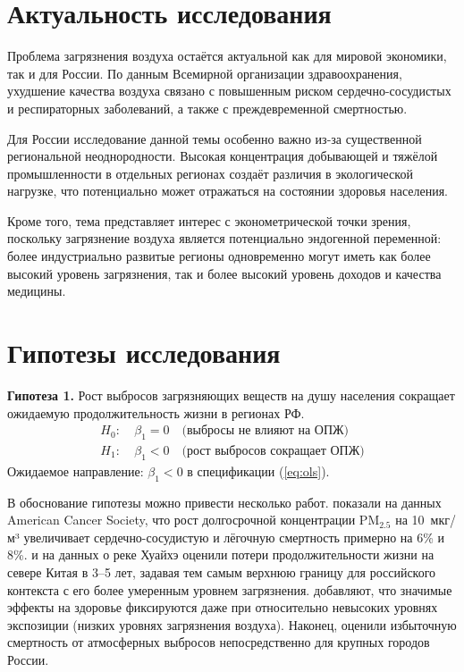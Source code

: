 \documentclass[11pt,a4paper]{article}
\begin{document}
\section*{Актуальность исследования}

Проблема загрязнения воздуха остаётся актуальной как для мировой экономики, так и для России. По данным Всемирной организации здравоохранения, ухудшение качества воздуха связано с повышенным риском сердечно-сосудистых и респираторных заболеваний, а также с преждевременной смертностью.

Для России исследование данной темы особенно важно из-за существенной региональной неоднородности. Высокая концентрация добывающей и тяжёлой промышленности в отдельных регионах создаёт различия в экологической нагрузке, что потенциально может отражаться на состоянии здоровья населения.

Кроме того, тема представляет интерес с эконометрической точки зрения, поскольку загрязнение воздуха является потенциально эндогенной переменной: более индустриально развитые регионы одновременно могут иметь как более высокий уровень загрязнения, так и более высокий уровень доходов и качества медицины.

\section*{Гипотезы исследования}

\textbf{Гипотеза 1.} Рост выбросов загрязняющих веществ на душу населения сокращает ожидаемую продолжительность жизни в регионах РФ.
\begin{align*}
H_0\colon\ & \beta_1 = 0 \quad \text{(выбросы не влияют на ОПЖ)}\\
H_1\colon\ & \beta_1 < 0 \quad \text{(рост выбросов сокращает ОПЖ)}
\end{align*}
Ожидаемое направление: $\beta_1 < 0$ в спецификации (\ref{eq:ols}).

В обоснование гипотезы можно привести несколько работ. \citet{pope2002} показали на данных American Cancer Society, что рост долгосрочной концентрации $\text{PM}_{2.5}$ на 10~мкг/м³ увеличивает сердечно-сосудистую и лёгочную смертность примерно на 6\% и 8\%. \citet{chen2013} и \citet{ebenstein2017} на данных о реке Хуайхэ оценили потери продолжительности жизни на севере Китая в 3--5 лет, задавая тем самым верхнюю границу для российского контекста с его более умеренным уровнем загрязнения. \citet{currie2005} добавляют, что значимые эффекты на здоровье фиксируются даже при относительно невысоких уровнях экспозиции (низких уровнях загрязнения воздуха). Наконец, \citet{revich1998} оценили избыточную смертность от атмосферных выбросов непосредственно для крупных городов России.
\end{document}
